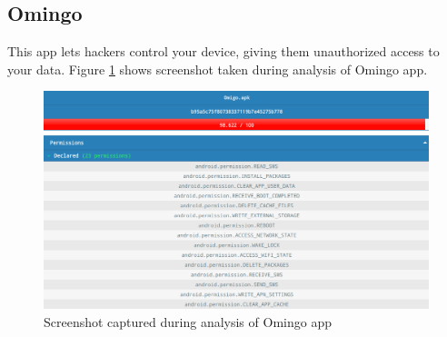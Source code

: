 \subsection{Omingo}
This app lets hackers control your device, giving them unauthorized access to your data. Figure \ref{fig:omingo} shows screenshot taken during analysis of Omingo app.
\begin{figure}[!h]
  \centering
  \includegraphics [scale=0.5] {omigo.png}
  \caption{Screenshot captured during analysis of Omingo app}
  \label{fig:omingo}
\end{figure}
